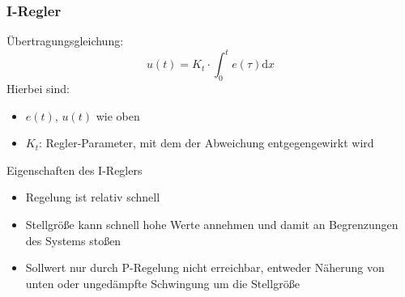 \documentclass[compress,11pt]{beamer}
\begin{document}
\subsubsection{I-Regler}
\begin{frame}

Übertragungsgleichung:
\begin{equation}
u(t) = K_t \cdot \int_0^t e(\tau) \mathrm{d}x
\end{equation}
Hierbei sind:
\begin{itemize}
\item $e(t)$, $u(t)$ wie oben
\item $K_t$: Regler-Parameter, mit dem der Abweichung entgegengewirkt wird
\end{itemize}
\end{frame}
\begin{frame}
\begin{block}{Eigenschaften des I-Reglers}
\begin{itemize}
\item Regelung ist relativ schnell
\item Stellgröße kann schnell hohe Werte annehmen und damit an Begrenzungen des Systems stoßen
\item Sollwert nur durch P-Regelung nicht erreichbar, entweder Näherung von unten oder ungedämpfte Schwingung um die Stellgröße
\end{itemize}
\end{block}

\end{frame}
\end{document}
